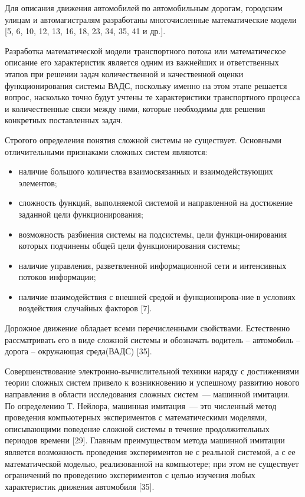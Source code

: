 \documentclass[a4paper,14pt]{article}
\begin{document}
Для описания движения автомобилей по автомобильным дорогам, городским улицам и автомагистралям разработаны многочисленные математические модели [5, 6, 10, 12, 13, 16, 18, 23, 34, 35, 41 и др.].

Разработка математической модели транспортного потока или математическое описание его характеристик является одним из важнейших и ответственных этапов при решении задач количественной и качественной оценки функционирования системы ВАДС, поскольку именно на этом этапе решается вопрос, насколько точно будут учтены те характеристики транспортного процесса и количественные связи между ними, которые необходимы для решения конкретных поставленных задач.

Строгого определения понятия сложной системы не существует. Основными отличительными признаками сложных систем являются:
\begin{itemize}
\item наличие большого количества взаимосвязанных и взаимодействующих элементов;
\item сложность функций, выполняемой системой и направленной на достижение заданной цели функционирования;
\item возможность разбиения системы на подсистемы, цели функци-онирования которых подчинены общей цели функционирования системы;
\item наличие управления, разветвленной информационной сети и интенсивных потоков информации;
\item наличие взаимодействия с внешней средой и функционирова-ние в условиях воздействия случайных факторов [7].
\end{itemize}

Дорожное движение обладает всеми перечисленными свойствами. Естественно рассматривать его в виде сложной системы и обозначать \glqq водитель – автомобиль – дорога – окружающая среда\grqq (ВАДС) [35].

Совершенствование электронно-вычислительной техники наряду с достижениями теории сложных систем привело к возникновению и успешному развитию нового направления в области исследования сложных систем~--- машинной имитации. По определению Т. Нейлора, машинная имитация~--- это численный метод проведения компьютерных экспериментов с математическими моделями, описывающими поведение сложной системы в течение продолжительных периодов времени [29]. Главным преимуществом метода машинной имитации является возможность проведения экспериментов не с реальной системой, а с ее математической моделью, реализованной на компьютере; при этом не существует ограничений по проведению экспериментов с целью изучения любых характеристик движения автомобиля [35].
\end{document}
